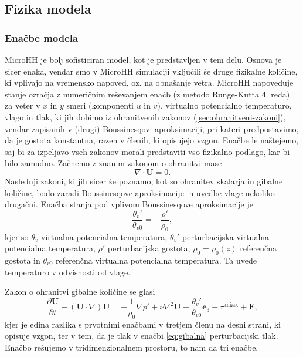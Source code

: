 \documentclass[mat2, tisk]{fmfdelo}
\begin{document}
\subsection{Fizika modela}
\subsubsection{Enačbe modela}
MicroHH je bolj sofisticiran model, kot je predstavljen v tem delu. Osnova
je sicer enaka, vendar smo v MicroHH simulaciji vključili še druge 
fizikalne količine, ki vplivajo na vremensko napoved, oz. na obnašanje 
vetra. 
MicroHH napoveduje stanje ozračja z numeričnim reševanjem enačb 
(z metodo Runge-Kutta 4. reda) za veter v $x$ in $y$ smeri (komponenti $u$ in $v$), virtualno potencialno temperaturo, 
vlago in tlak, ki jih dobimo iz ohranitvenih zakonov (\ref{sec:ohranitveni-zakoni}), vendar zapisanih v (drugi) 
Boussinesqovi aproksimaciji, pri kateri predpostavimo, da je gostota 
konstantna, razen v členih, ki opisujejo vzgon. Enačbe le naštejemo, 
saj bi za izpeljavo vseh zakonov morali predstaviti vso fizikalno 
podlago, kar bi bilo zamudno. Začnemo z znanim zakonom o 
ohranitvi mase 
$$
\nabla \cdot \textbf{U} = 0.
$$
Naslednji zakoni, ki jih sicer že poznamo, kot so ohranitev skalarja in
gibalne količine, bodo zaradi Boussinesqove aproksimacije in uvedbe vlage nekoliko drugačni. 
Enačba stanja pod vplivom Boussinesqove aproksimacije je
\begin{equation*}
\frac{\theta_v'}{\theta_{v0}} = - \frac{\rho'}{\rho_0},
\end{equation*}
kjer so $\theta_v$ virtualna potencialna temperatura, $\theta_v'$ 
perturbacijska virtualna potencialna temperatura, $\rho'$
perturbacijska gostota, $\rho_0 = \rho_0(z)$ referenčna gostota in 
$\theta_{v0}$ referenčna virtualna potencialna temperatura.
Ta uvede temperaturo v odvisnosti od vlage.

\noindent
Zakon o ohranitvi gibalne količine se glasi
\begin{equation}
\label{eq:gibalna}
\frac{\partial \textbf{U}}{\partial t} + (\textbf{U} \cdot \nabla)\textbf{U} = -\frac{1}{\rho_0}\nabla p' + \nu \nabla^2 \textbf{U} + \frac{\theta_v'}{\theta_{v0}} \textbf{e}_3 + \tau^{\text{anizo.}} + \textbf{F},
\end{equation}
kjer je edina razlika s prvotnimi enačbami v tretjem členu na desni strani, ki opisuje vzgon,
ter v tem, da je tlak v enačbi \eqref{eq:gibalna} perturbacijski tlak. Enačbo rešujemo v tridimenzionalnem prostoru, 
to nam da tri enačbe.
\end{document}
